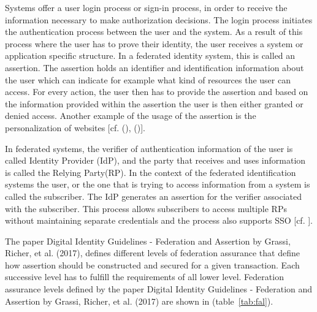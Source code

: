 Systems offer a user login process or sign-in process, in order to receive the information necessary to make authorization decisions. The login process initiates the authentication process between the user and the system. As a result of this process where the user has to prove their identity, the user receives a system or application specific structure. In a federated identity system, this is called an assertion. The assertion holds an identifier and identification information about the user which can indicate for example what kind of resources the user can access. For every action, the user then has to provide the assertion and based on the information provided within the assertion the user is then either granted or denied access. Another example of the usage of the assertion is the personalization of websites [cf. (\cite{Todorov:2007:MUI}), (\cite{NIST:2017:DIG})].

In federated systems, the verifier of authentication information of the user is called Identity Provider (IdP), and the party that receives and uses information is called the Relying Party(RP). In the context of the federated identification systems the user, or the one that is trying to access information from a system is called the subscriber. The IdP generates an assertion for the verifier associated with the subscriber. This process allows subscribers to access multiple RPs without maintaining separate credentials and the process also supports SSO [cf. \cite{NIST:2017:DIGFA}].

The paper Digital Identity Guidelines - Federation and Assertion by Grassi, Richer, et al. (2017), defines different levels of federation assurance that define how assertion should be constructed and secured for a given transaction. Each successive level has to fulfill the requirements of all lower level. Federation assurance levels defined by the paper Digital Identity Guidelines - Federation and Assertion by Grassi, Richer, et al.  (2017) are shown in (table~\ref{tab:fal}).



